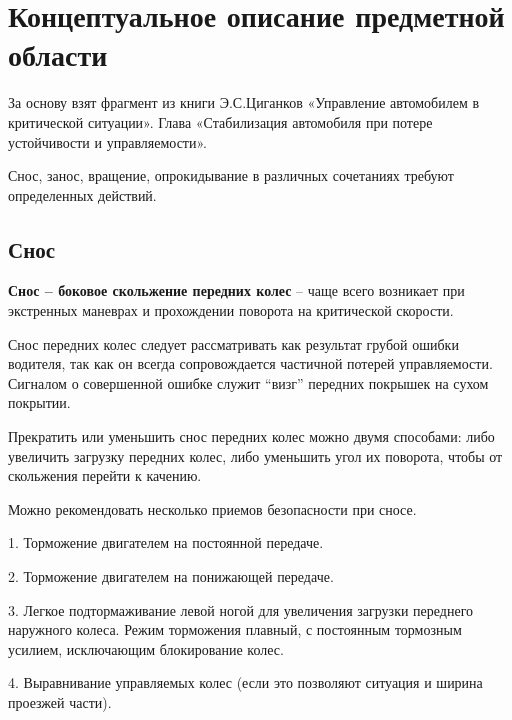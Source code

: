 \section{Концептуальное описание предметной области}

За основу взят фрагмент из книги Э.С.Циганков «Управление автомобилем в критической ситуации». Глава «Стабилизация автомобиля при потере устойчивости и управляемости».

Снос, занос, вращение, опрокидывание в различных сочетаниях требуют определенных действий.


\subsection{Снос}

\textbf{Снос – боковое скольжение передних колес} – чаще всего возникает при экстренных маневрах и прохождении поворота на критической скорости. 

Снос передних колес следует рассматривать как результат грубой ошибки водителя, так как он всегда сопровождается частичной потерей управляемости. Сигналом о совершенной ошибке служит “визг” передних покрышек на сухом покрытии.

Прекратить или уменьшить снос передних колес можно двумя способами: либо увеличить загрузку передних колес, либо уменьшить угол их поворота, чтобы от скольжения перейти к качению.

Можно рекомендовать несколько приемов безопасности при сносе.

1. Торможение двигателем на постоянной передаче.

2. Торможение двигателем на понижающей передаче.

3. Легкое подтормаживание левой ногой для увеличения загрузки переднего наружного колеса. Режим торможения плавный, с постоянным тормозным усилием, исключающим блокирование колес.

4. Выравнивание управляемых колес (если это позволяют ситуация и ширина проезжей части).

